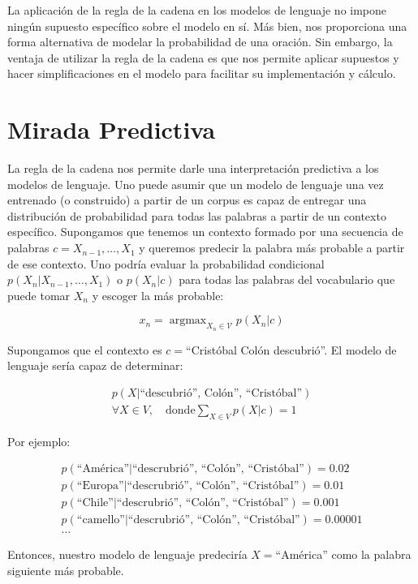 La aplicación de la regla de la cadena en los modelos de lenguaje no impone ningún supuesto específico sobre el modelo en sí. Más bien, nos proporciona una forma alternativa de modelar la probabilidad de una oración. Sin embargo, la ventaja de utilizar la regla de la cadena es que nos permite aplicar supuestos y hacer simplificaciones en el modelo para facilitar su implementación y cálculo.

\section{Mirada Predictiva}
La regla de la cadena nos permite darle una interpretación predictiva a los modelos de lenguaje. Uno puede asumir que un modelo de lenguaje una vez entrenado (o construido) a partir de un corpus es capaz de entregar una distribución de probabilidad para todas las palabras a partir de un contexto específico. Supongamos que tenemos un contexto formado por una secuencia de palabras $c=X_{n-1},\ldots,X_1$ y queremos predecir la palabra más probable a partir de ese contexto. Uno podría evaluar la probabilidad condicional $p(X_n|X_{n-1},\ldots,X_1)$ o $p(X_n|c)$ para todas las palabras del vocabulario que puede tomar $X_n$ y escoger la más probable:

\begin{displaymath}
x_n = \operatorname{argmax}_{X_n \in \mathcal{V}} p(X_n | c)
\end{displaymath}


\begin{example}
Supongamos que el contexto es $c=$``Cristóbal Colón descubrió''. El modelo de lenguaje sería capaz de determinar:

\begin{align*}
p(X|\text{``descubrió'', Colón'', ``Cristóbal''}) \\
\forall X \in V, \quad \text{donde} \sum_{X\in V}p(X|c)=1 
\end{align*}

Por ejemplo:

 
\begin{align*}
p(\text{``América''}|\text{``descrubrió'', ``Colón'', ``Cristóbal''}) = 0.02 \\
p(\text{``Europa''}|\text{``descrubrió'', ``Colón'', ``Cristóbal''}) = 0.01 \\
p(\text{``Chile''}|\text{``descrubrió'', ``Colón'', ``Cristóbal''}) = 0.001\\
p(\text{``camello''}|\text{``descrubrió'', ``Colón'', ``Cristóbal''}) = 0.00001 \\
\ldots
\end{align*}

Entonces, nuestro modelo de lenguaje predeciría $X=$``América'' como la palabra siguiente más probable.  
\end{example}

